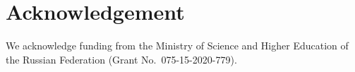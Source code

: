 \documentclass[preprint,12pt]{elsarticle}
\begin{document}
\section{Acknowledgement}
\label{sec:6}
We acknowledge funding from the Ministry of Science and Higher Education of the Russian Federation (Grant No.~075-15-2020-779).






% 
% 





\end{document}
